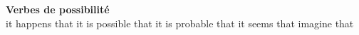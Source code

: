{\sffamily\bfseries Verbes de possibilité}\\
 { }   {it happens that}
   {it is possible that}
   {it is probable that}
   {it seems that}
   {imagine that}
